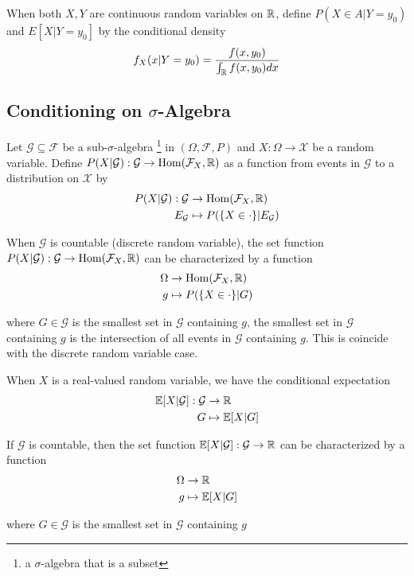 \documentclass{report}
\begin{document}
\begin{definition}
    When both $X, Y$ are continuous random variables on $\mathbb{R}$, define $P(X \in A | Y = y_0)$ and $E[X|Y=y_0]$ by the conditional density
    $$
        f_X(x|Y = y_0) = \frac{f(x, y_0)}{\int_{\mathbb{R}} f(x, y_0) dx}
    $$
\end{definition}

\subsection{Conditioning on $\sigma$-Algebra}

\begin{definition}
    Let $\mathcal{G} \subseteq \mathcal{F}$ be a sub-$\sigma$-algebra \footnote{a $\sigma$-algebra that is a subset} in $(\Omega, \mathcal{F}, P)$ and $X: \Omega \to \mathcal{X}$ be a random variable. Define $P(X|\mathcal{G}): \mathcal{G} \to \operatorname{Hom}(\mathcal{F}_X, \mathbb{R})$ as a function from events in $\mathcal{G}$ to a distribution on $\mathcal{X}$ by
    \begin{align*}
    	P(X | \mathcal{G}): \mathcal{G} &\to \operatorname{Hom}(\mathcal{F}_X, \mathbb{R}) \\
    	E_\mathcal{G} &\mapsto P(\{X \in \cdot\} | E_\mathcal{G})
    \end{align*}

	When $\mathcal{G}$ is countable (discrete random variable), the set function $P(X | \mathcal{G}): \mathcal{G} \to \operatorname{Hom}(\mathcal{F}_X, \mathbb{R})$ can be characterized by a function
	\begin{align*}
		\Omega &\to \operatorname{Hom}(\mathcal{F}_X, \mathbb{R}) \\
		g &\mapsto P(\{X \in \cdot\} | G)
	\end{align*}
	
	where $G \in \mathcal{G}$ is the smallest set in $\mathcal{G}$ containing $g$, the smallest set in $\mathcal{G}$ containing $g$ is the intersection of all events in $\mathcal{G}$ containing $g$. This is coincide with the discrete random variable case.
\end{definition}

\begin{remark}
	When $X$ is a real-valued random variable, we have the conditional expectation
	\begin{align*}
		\mathbb{E}[X | \mathcal{G}]: \mathcal{G} &\to \mathbb{R} \\
		G &\mapsto \mathbb{E}[X | G]
	\end{align*}
	
	If $\mathcal{G}$ is countable, then the set function $\mathbb{E}[X | \mathcal{G}]: \mathcal{G} \to \mathbb{R}$ can be characterized by a function
	\begin{align*}
		\Omega &\to \mathbb{R} \\
		g &\mapsto \mathbb{E}[X|G]
	\end{align*}
	
	where $G \in \mathcal{G}$ is the smallest set in $\mathcal{G}$ containing $g$
\end{remark}
\end{document}
